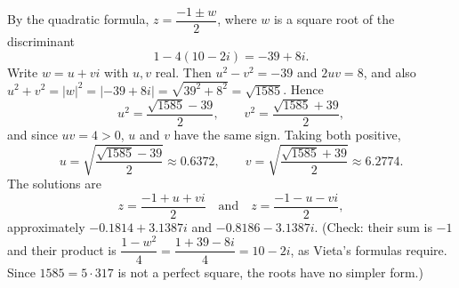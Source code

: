 By the quadratic formula, $z=\dfrac{-1\pm w}{2}$, where $w$ is a square root of the discriminant
\[1-4(10-2i)=-39+8i.\]
Write $w=u+vi$ with $u,v$ real. Then $u^2-v^2=-39$ and $2uv=8$, and also $u^2+v^2=|w|^2=|-39+8i|=\sqrt{39^2+8^2}=\sqrt{1585}$. Hence
\[u^2=\dfrac{\sqrt{1585}-39}{2},\qquad v^2=\dfrac{\sqrt{1585}+39}{2},\]
and since $uv=4>0$, $u$ and $v$ have the same sign. Taking both positive,
\[u=\sqrt{\dfrac{\sqrt{1585}-39}{2}}\approx0.6372,\qquad v=\sqrt{\dfrac{\sqrt{1585}+39}{2}}\approx6.2774.\]
The solutions are
\[\boxed{z=\dfrac{-1+u+vi}{2}\quad\text{and}\quad z=\dfrac{-1-u-vi}{2}},\]
approximately $-0.1814+3.1387i$ and $-0.8186-3.1387i$. (Check: their sum is $-1$ and their product is $\dfrac{1-w^2}{4}=\dfrac{1+39-8i}{4}=10-2i$, as Vieta's formulas require. Since $1585=5\cdot317$ is not a perfect square, the roots have no simpler form.)
